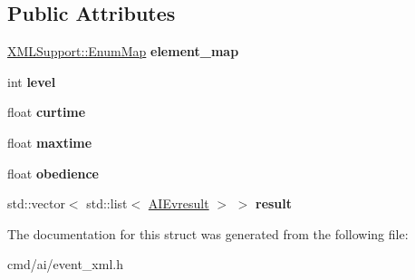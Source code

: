 \subsection*{Public Attributes}
\begin{DoxyCompactItemize}
\item 
\hyperlink{classXMLSupport_1_1EnumMap}{X\+M\+L\+Support\+::\+Enum\+Map} {\bfseries element\+\_\+map}\hypertarget{structAIEvents_1_1ElemAttrMap_a7751e8b8b493976eaed39ca75ca77ec9}{}\label{structAIEvents_1_1ElemAttrMap_a7751e8b8b493976eaed39ca75ca77ec9}

\item 
int {\bfseries level}\hypertarget{structAIEvents_1_1ElemAttrMap_a19f58781fc82f05e9f84cf3a52acaee6}{}\label{structAIEvents_1_1ElemAttrMap_a19f58781fc82f05e9f84cf3a52acaee6}

\item 
float {\bfseries curtime}\hypertarget{structAIEvents_1_1ElemAttrMap_af8a0eb5af510a5cda9c5879ced0f5c04}{}\label{structAIEvents_1_1ElemAttrMap_af8a0eb5af510a5cda9c5879ced0f5c04}

\item 
float {\bfseries maxtime}\hypertarget{structAIEvents_1_1ElemAttrMap_ab1b04f6f0da77095a9bd21b7bf133e9b}{}\label{structAIEvents_1_1ElemAttrMap_ab1b04f6f0da77095a9bd21b7bf133e9b}

\item 
float {\bfseries obedience}\hypertarget{structAIEvents_1_1ElemAttrMap_a563fbbf9f36d7e92866665b3bb1be248}{}\label{structAIEvents_1_1ElemAttrMap_a563fbbf9f36d7e92866665b3bb1be248}

\item 
std\+::vector$<$ std\+::list$<$ \hyperlink{structAIEvents_1_1AIEvresult}{A\+I\+Evresult} $>$ $>$ {\bfseries result}\hypertarget{structAIEvents_1_1ElemAttrMap_a831c7133a5f689ee88f8736f91f6a479}{}\label{structAIEvents_1_1ElemAttrMap_a831c7133a5f689ee88f8736f91f6a479}

\end{DoxyCompactItemize}


The documentation for this struct was generated from the following file\+:\begin{DoxyCompactItemize}
\item 
cmd/ai/event\+\_\+xml.\+h\end{DoxyCompactItemize}
